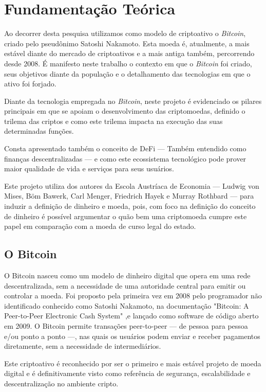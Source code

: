 \chapter{Fundamentação Teórica}
Ao decorrer desta pesquisa utilizamos como modelo de criptoativo o \textit{Bitcoin}, criado pelo pseudônimo Satoshi Nakamoto. Esta moeda é, atualmente, a mais estável diante do mercado de criptoativos e a mais antiga também, percorrendo desde 2008. É manifesto neste trabalho o contexto em que o \textit{Bitcoin} foi criado, seus objetivos diante da população e o detalhamento das tecnologias em que o ativo foi forjado.

Diante da tecnologia empregada no \textit{Bitcoin}, neste projeto é evidenciado os pilares principais em que se apoiam o desenvolvimento das criptomoedas, definido o trilema das criptos e como este trilema impacta na execução das suas determinadas funções.

Consta apresentado também o conceito de DeFi — Também entendido como finanças descentralizadas — e como este ecossistema tecnológico pode prover maior qualidade de vida e serviços para seus usuários.

Este projeto utiliza dos autores da Escola Austríaca de Economia — Ludwig von Mises, Böm Bawerk, Carl Menger, Friedrich Hayek e Murray Rothbard — para induzir a definição de dinheiro e moeda, pois, com foco na definição do conceito de dinheiro é possível argumentar o quão bem uma criptomoeda cumpre este papel em comparação com a moeda de curso legal do estado. 

\section{O Bitcoin} \label{sec:bitcoin}
O Bitcoin nasceu como um modelo de dinheiro digital que opera em uma rede descentralizada, sem a necessidade de uma autoridade central para emitir ou controlar a moeda. Foi proposto pela primeira vez em 2008 pelo programador não identificado conhecido como Satoshi Nakamoto, na documentação "Bitcoin: A Peer-to-Peer Electronic Cash System" \cite{Nakamoto2009} ,e lançado como software de código aberto em 2009. O Bitcoin permite transações peer-to-peer — de pessoa para pessoa e/ou ponto a ponto —, nas quais os usuários podem enviar e receber pagamentos diretamente, sem a necessidade de intermediários.

Este criptoativo é reconhecido por ser o primeiro e mais estável projeto de moeda digital e é definitivamente visto como referência de segurança, escalabilidade e descentralização no ambiente cripto.

